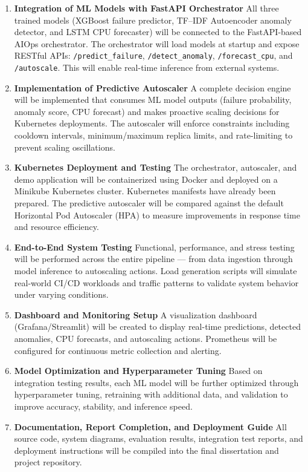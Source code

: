 \documentclass[12pt]{report}
\begin{document}
\begin{enumerate}
    \item \textbf{Integration of ML Models with FastAPI Orchestrator}  
    All three trained models (XGBoost failure predictor, TF--IDF Autoencoder anomaly detector, and LSTM CPU forecaster) will be connected to the FastAPI-based AIOps orchestrator. The orchestrator will load models at startup and expose RESTful APIs: \texttt{/predict\_failure}, \texttt{/detect\_anomaly}, \texttt{/forecast\_cpu}, and \texttt{/autoscale}. This will enable real-time inference from external systems.
    
    \item \textbf{Implementation of Predictive Autoscaler}  
    A complete decision engine will be implemented that consumes ML model outputs (failure probability, anomaly score, CPU forecast) and makes proactive scaling decisions for Kubernetes deployments. The autoscaler will enforce constraints including cooldown intervals, minimum/maximum replica limits, and rate-limiting to prevent scaling oscillations.
    
    \item \textbf{Kubernetes Deployment and Testing}  
    The orchestrator, autoscaler, and demo application will be containerized using Docker and deployed on a Minikube Kubernetes cluster. Kubernetes manifests have already been prepared. The predictive autoscaler will be compared against the default Horizontal Pod Autoscaler (HPA) to measure improvements in response time and resource efficiency.
    
    \item \textbf{End-to-End System Testing}  
    Functional, performance, and stress testing will be performed across the entire pipeline --- from data ingestion through model inference to autoscaling actions. Load generation scripts will simulate real-world CI/CD workloads and traffic patterns to validate system behavior under varying conditions.
    
    \item \textbf{Dashboard and Monitoring Setup}  
    A visualization dashboard (Grafana/Streamlit) will be created to display real-time predictions, detected anomalies, CPU forecasts, and autoscaling actions. Prometheus will be configured for continuous metric collection and alerting.
    
    \item \textbf{Model Optimization and Hyperparameter Tuning}  
    Based on integration testing results, each ML model will be further optimized through hyperparameter tuning, retraining with additional data, and validation to improve accuracy, stability, and inference speed.
    
    \item \textbf{Documentation, Report Completion, and Deployment Guide}  
    All source code, system diagrams, evaluation results, integration test reports, and deployment instructions will be compiled into the final dissertation and project repository.
\end{enumerate}
\end{document}
